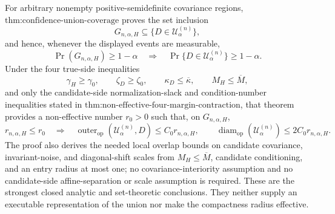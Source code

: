 For arbitrary nonempty positive-semidefinite covariance regions, \(\text{thm:confidence-union-coverage}\) proves the set inclusion
\[
G_{n,\alpha,H}\subseteq\{D\in\mathcal U^{(n)}_\alpha\},
\]
and hence, whenever the displayed events are measurable,
\[
\Pr(G_{n,\alpha,H})\geq 1-\alpha
\quad\Longrightarrow\quad
\Pr\{D\in\mathcal U^{(n)}_\alpha\}\geq 1-\alpha.
\]
Under the four true-side inequalities
\[
\gamma_H\geq\gamma_0,
\qquad
\zeta_D\geq\zeta_0,
\qquad
\kappa_D\leq\overline\kappa,
\qquad
M_H\leq\overline M,
\]
and only the candidate-side normalization-slack and condition-number inequalities stated in \(\text{thm:non-effective-four-margin-contraction}\), that theorem provides a non-effective number \(r_0>0\) such that, on \(G_{n,\alpha,H}\),
\[
r_{n,\alpha,H}\leq r_0
\quad\Longrightarrow\quad
\operatorname{outer}_{\mathrm{op}}(\mathcal U^{(n)}_\alpha,D)
\leq C_0r_{n,\alpha,H},
\qquad
\operatorname{diam}_{\mathrm{op}}(\mathcal U^{(n)}_\alpha)
\leq 2C_0r_{n,\alpha,H}.
\]
The proof also derives the needed local overlap bounds on candidate covariance, invariant-noise, and diagonal-shift scales from \(M_H\leq\overline M\), candidate conditioning, and an entry radius at most one; no covariance-interiority assumption and no candidate-side affine-separation or scale assumption is required. These are the strongest closed analytic and set-theoretic conclusions. They neither supply an executable representation of the union nor make the compactness radius effective.